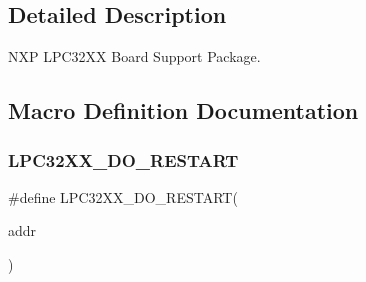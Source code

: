 \subsection{Detailed Description}
N\+XP L\+P\+C32\+XX Board Support Package. 



\subsection{Macro Definition Documentation}
\mbox{\label{group__RTEMSBSPsARMLPC32XX_ga578433ce05071d07d57350a50cd49e48}} 
\subsubsection{\texorpdfstring{LPC32XX\_DO\_RESTART}{LPC32XX\_DO\_RESTART}}
{\footnotesize\ttfamily \#define L\+P\+C32\+X\+X\+\_\+\+D\+O\+\_\+\+R\+E\+S\+T\+A\+RT(\begin{DoxyParamCaption}\item[{}]{addr }\end{DoxyParamCaption})}

